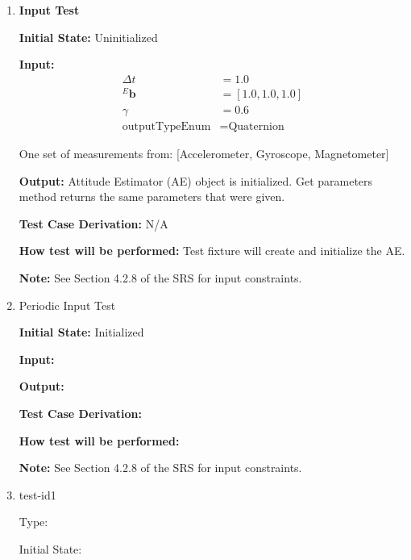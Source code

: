 \documentclass[12pt, titlepage]{article}
\begin{document}
\begin{enumerate}


    \item{\textbf{Input Test}\\}
                
    \textbf{Initial State:} Uninitialized
                
      \textbf{Input:} \begin{align*}
        \Delta t &= 1.0\\
        {}^E\mathbf{b} &= [1.0, 1.0, 1.0]\\
        \gamma &= 0.6\\
        \text{outputTypeEnum} &= \text{Quaternion}
      \end{align*}
    
      One set of measurements from: [Accelerometer, Gyroscope, Magnetometer]
                
      \textbf{Output:} Attitude Estimator (AE) object is initialized. Get parameters method returns the same parameters that were given.
    
      \textbf{Test Case Derivation:} N/A
                
      \textbf{How test will be performed:} Test fixture will create and initialize the AE.
    
      \textbf{Note:} See Section 4.2.8 of the SRS for input constraints.
    
    \item{Periodic Input Test\\}
                
    \textbf{Initial State:} Initialized
                
    \textbf{Input:}
                
    \textbf{Output:} 
    
    \textbf{Test Case Derivation:} 
    
    \textbf{How test will be performed:}
    
    \textbf{Note:} See Section 4.2.8 of the SRS for input constraints.
    

\item{test-id1\\}

Type: 
					
Initial State: 
					

\end{enumerate}
\end{document}
